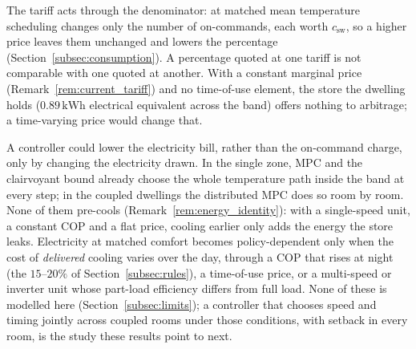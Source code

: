 \documentclass[3p,twocolumn,number]{elsarticle}
\newcommand{\csw}{c_{\mathrm{sw}}}
\newcommand{\kWh}{\text{kWh}}
\begin{document}
The tariff acts through the denominator: at matched mean temperature scheduling changes only the number of on-commands, each worth $\csw$, so a higher price leaves them unchanged and lowers the percentage (Section~\ref{subsec:consumption}). A percentage quoted at one tariff is not comparable with one quoted at another. With a constant marginal price (Remark~\ref{rem:current_tariff}) and no time-of-use element, the store the dwelling holds ($0.89\,\kWh$ electrical equivalent across the band) offers nothing to arbitrage; a time-varying price would change that.

A controller could lower the electricity bill, rather than the on-command charge, only by changing the electricity drawn. In the single zone, MPC and the clairvoyant bound already choose the whole temperature path inside the band at every step; in the coupled dwellings the distributed MPC does so room by room. None of them pre-cools (Remark~\ref{rem:energy_identity}): with a single-speed unit, a constant COP and a flat price, cooling earlier only adds the energy the store leaks. Electricity at matched comfort becomes policy-dependent only when the cost of \emph{delivered} cooling varies over the day, through a COP that rises at night (the $15$--$20\%$ of Section~\ref{subsec:rules}), a time-of-use price, or a multi-speed or inverter unit whose part-load efficiency differs from full load. None of these is modelled here (Section~\ref{subsec:limits}); a controller that chooses speed and timing jointly across coupled rooms under those conditions, with setback in every room, is the study these results point to next.
\end{document}
